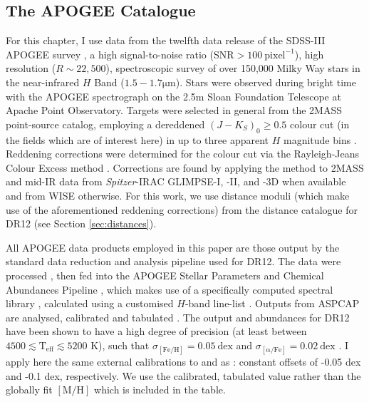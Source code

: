  \subsection{The APOGEE Catalogue}
 \label{sec:APOGEE}
For this chapter, I use data from the twelfth data release \citep[DR12,][]{2015ApJS..219...12A} of the SDSS-III APOGEE survey \citep[][]{2015arXiv150905420M}, a high signal-to-noise ratio (SNR$>100\ \mathrm{pixel}^{-1}$), high resolution ($R \sim 22,500$), spectroscopic survey of over 150,000 Milky Way stars in the near-infrared $H$ Band ($1.5 - 1.7 \mathrm{\mu m}$). Stars were observed during bright time with the APOGEE spectrograph \citep{2010SPIE.7735E..1CW} on the 2.5m Sloan Foundation Telescope \citep{2006AJ....131.2332G} at Apache Point Observatory. Targets were selected in general from the 2MASS point-source catalog, employing a dereddened $(J-K_S)_0 \geq 0.5$ colour cut (in the fields which are of interest here) in up to three apparent $H$ magnitude bins \citep[for a full description of the APOGEE target selection, see][]{2013AJ....146...81Z}. Reddening corrections were determined for the colour cut via the Rayleigh-Jeans Colour Excess method \citep[RJCE,][]{2011ApJ...739...25M}. Corrections are found by applying the method to 2MASS \citep{2006AJ....131.1163S} and mid-IR data from \emph{Spitzer}-IRAC GLIMPSE-I, -II, and -3D \citep{2009PASP..121..213C} when available and from WISE \citep{2010AJ....140.1868W} otherwise. For this work, we use distance moduli (which make use of the aforementioned reddening corrections) from the \citet{2015ApJ...808..132H} distance catalogue for DR12 (see Section \ref{sec:distances}). 

 All APOGEE data products employed in this paper are those output by the standard data reduction and analysis pipeline used for DR12. The data were processed \citep{2015AJ....150..173N}, then fed into the APOGEE Stellar Parameters and Chemical Abundances Pipeline \citep[ASPCAP,][]{2016AJ....151..144G}, which makes use of a specifically computed spectral library \citep{2015AJ....149..181Z}, calculated using a customised $H$-band line-list \citep{2015ApJS..221...24S}. Outputs from ASPCAP are analysed, calibrated and tabulated \citep{2015AJ....150..148H}. The output \afe{} and \feh{} abundances for DR12 have been shown to have a high degree of precision (at least between $4500 \lesssim \mathrm{T_{\mathrm{eff}}} \lesssim 5200$ K), such that $\sigma_{\mathrm{[Fe/H]}} = 0.05\ \mathrm{dex}$ and $\sigma_{\mathrm{[\alpha/Fe]}} = 0.02\ \mathrm{dex}$ \citep{2016ApJ...823...30B}. I apply here the same external calibrations to \afe{} and \feh{} as \citet{2016ApJ...823...30B}: constant offsets of -0.05 dex and -0.1 dex, respectively. We use the calibrated, tabulated \feh{} value rather than the globally fit $\mathrm{[M/H]}$ which is included in the table.

